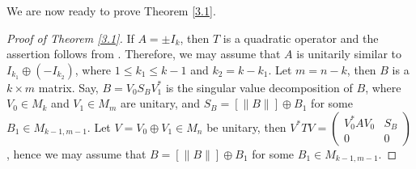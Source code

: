 \documentclass[11pt]{article}
\numberwithin{equation}{section}
\begin{document}
We are now ready to prove Theorem \ref{3.1}.

\begin{proof}[Proof of Theorem \ref{3.1}]
If $A=\pm I_k$, then $T$ is a quadratic operator and the assertion follows from \cite[Theorem 2.1]{TW}. Therefore, we may assume that $A$ is unitarily similar to $I_{k_1}\oplus (-I_{k_2})$, where $1\le k_1\le k-1$ and $k_2=k-k_1$. Let $m=n-k$, then $B$ is a $k\times m$ matrix. Say, $B=V_0S_B V_1^*$ is the singular value decomposition of $B$, where $V_0\in M_k$ and $V_1\in M_m$ are unitary, and $S_B=[\|B\|]\oplus B_1$ for some $B_1\in M_{k-1, m-1}$. Let $V=V_0\oplus V_1\in M_n$ be unitary, then $V^*TV=\begin{pmatrix} V_0^*AV_0 & S_B\\ 0 & 0\end{pmatrix}$, hence we may assume that $B=[\|B\|]\oplus B_1$ for some $B_1\in M_{k-1, m-1}$.


\end{proof}
\end{document}
